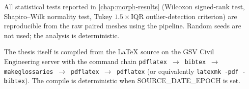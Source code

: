 \begin{description}[leftmargin=2.6cm,style=nextline,
                    font=\bfseries\color{gsvblue}]
  \item[Analysis pipeline] All statistical tests reported in
    \cref{chap:morph-results} (Wilcoxon signed-rank test,
    Shapiro--Wilk normality test, Tukey $1.5\times$\gls{IQR}
    outlier-detection criterion) are reproducible from the raw
    paired meshes using the pipeline. Random seeds are not used;
    the analysis is deterministic.

  \item[Compilation] The thesis itself is compiled from the LaTeX
    source on the GSV Civil Engineering server with the command
    chain \texttt{pdflatex \(\to\) bibtex \(\to\) makeglossaries
    \(\to\) pdflatex \(\to\) pdflatex} (or equivalently
    \texttt{latexmk -pdf -bibtex}). The compile is deterministic
    when {\ttfamily SOURCE\_DATE\_EPOCH} is set.

\end{description}

\endgroup
